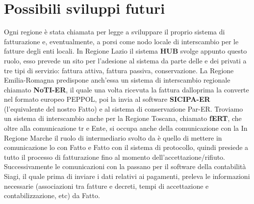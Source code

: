 \chapter{Possibili sviluppi futuri}

Ogni regione è stata chiamata per legge a sviluppare il proprio sistema di fatturazione e, eventualmente, a porsi come nodo locale di interscambio per le fatture degli enti locali.
In Regione Lazio il sistema \textbf{HUB}  svolge appunto questo ruolo, esso prevede un sito per l'adesione al sistema da parte delle e dei privati a tre tipi di servizio: fattura attiva, fattura passiva, conservazione.
La Regione Emilia-Romagna predispone anch'essa un sistema di interscambio regionale chiamato \textbf{NoTI-ER}, il quale una volta ricevuta la fattura dalloprima la converte nel formato europeo PEPPOL, poi la invia al software \textbf{SICIPA-ER} (l'equivalente del nostro Fatto) e al sistema di conservazione Par-ER.
Troviamo un sistema di interscambio anche per la Regione Toscana, chiamato \textbf{fERT}, che oltre alla comunicazione tr e Ente, si occupa anche della comunicazione con la
In Regione Marche il ruolo di intermediario svolto da  è quello di mettere in comunicazione lo con Fatto e Fatto con il sistema di protocollo, quindi presiede a tutto il processo di fatturazione fino al momento dell'accettazione/rifiuto.
Successivamente le comunicazioni con la passano per il software della contabilità Siagi, il quale prima di inviare i dati relativi ai pagamenti, preleva le informazioni necessarie (associazioni tra fatture e decreti, tempi di accettazione e contabilizzazione, etc) da Fatto.





